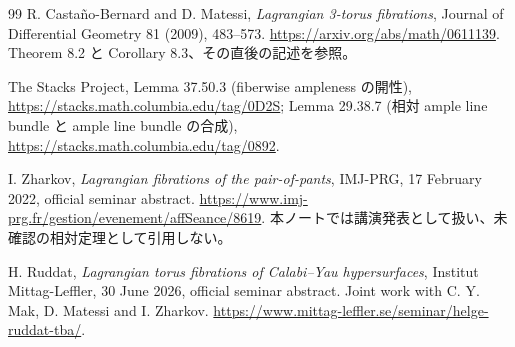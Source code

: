 \documentclass[11pt,a4paper]{article}
\theoremstyle{definition}
\begin{document}
\begin{thebibliography}{99}
R. Castaño-Bernard and D. Matessi,
\emph{Lagrangian 3-torus fibrations},
Journal of Differential Geometry 81 (2009), 483--573.
\url{https://arxiv.org/abs/math/0611139}.
Theorem 8.2 と Corollary 8.3、その直後の記述を参照。

The Stacks Project, Lemma 37.50.3 (fiberwise ampleness の開性),
\url{https://stacks.math.columbia.edu/tag/0D2S};
Lemma 29.38.7 (相対 ample line bundle と ample line bundle の合成),
\url{https://stacks.math.columbia.edu/tag/0892}.

I. Zharkov, \emph{Lagrangian fibrations of the pair-of-pants},
IMJ-PRG, 17 February 2022, official seminar abstract.
\url{https://www.imj-prg.fr/gestion/evenement/affSeance/8619}.
本ノートでは講演発表として扱い、未確認の相対定理として引用しない。

H. Ruddat, \emph{Lagrangian torus fibrations of Calabi--Yau hypersurfaces},
Institut Mittag-Leffler, 30 June 2026, official seminar abstract.
Joint work with C. Y. Mak, D. Matessi and I. Zharkov.
\url{https://www.mittag-leffler.se/seminar/helge-ruddat-tba/}.

\end{thebibliography}
\end{document}
